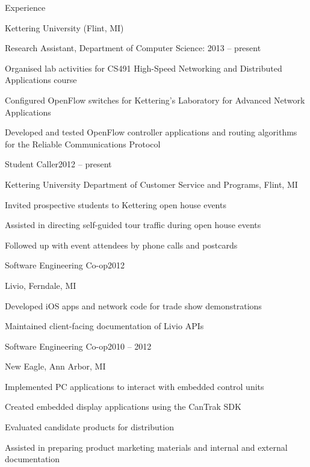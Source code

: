 \documentclass[letterpaper,12pt,oneside,compact]{article}
\begin{document}
\begin{heading}{Experience}
\begin{resitem}{Kettering University (Flint, MI)}
\item Research Assistant, Department of Computer Science: 2013 -- present
\item Organised lab activities for CS491 High-Speed Networking and 
      Distributed Applications course
\item Configured OpenFlow switches for Kettering's Laboratory for Advanced 
      Network Applications
\item Developed and tested OpenFlow controller applications and routing algorithms 
      for the Reliable Communications Protocol
\end{resitem}

\begin{resitem}{Student Caller\hfill 2012 -- present}
\item Kettering University Department of Customer Service and Programs, Flint, MI
\item Invited prospective students to Kettering open house events
\item Assisted in directing self-guided tour traffic during open house events
\item Followed up with event attendees by phone calls and postcards
\end{resitem}

\begin{resitem}{Software Engineering Co-op\hfill 2012}
\item Livio, Ferndale, MI
\item Developed iOS apps and network code for trade show demonstrations
\item Maintained client-facing documentation of Livio APIs
\end{resitem}

\begin{resitem}{Software Engineering Co-op\hfill 2010 -- 2012}
\item New Eagle, Ann Arbor, MI
\item Implemented PC applications to interact with embedded control units
\item Created embedded display applications using the CanTrak SDK
\item Evaluated candidate products for distribution
\item Assisted in preparing product marketing materials and internal and 
      external documentation
\end{resitem}
\end{heading}
\end{document}
